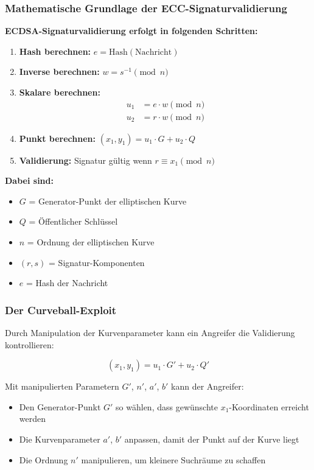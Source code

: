 \documentclass{article}
\begin{document}
\subsubsection{Mathematische Grundlage der ECC-Signaturvalidierung}

\textbf{ECDSA-Signaturvalidierung erfolgt in folgenden Schritten:}

\begin{enumerate}
    \item \textbf{Hash berechnen:} $e = \text{Hash}(\text{Nachricht})$
    \item \textbf{Inverse berechnen:} $w = s^{-1} \pmod{n}$
    \item \textbf{Skalare berechnen:} 
    \begin{align}
    u_1 &= e \cdot w \pmod{n} \\
    u_2 &= r \cdot w \pmod{n}
    \end{align}
    \item \textbf{Punkt berechnen:} $(x_1, y_1) = u_1 \cdot G + u_2 \cdot Q$
    \item \textbf{Validierung:} Signatur gültig wenn $r \equiv x_1 \pmod{n}$
\end{enumerate}

\textbf{Dabei sind:}
\begin{itemize}
    \item $G$ = Generator-Punkt der elliptischen Kurve
    \item $Q$ = Öffentlicher Schlüssel  
    \item $n$ = Ordnung der elliptischen Kurve
    \item $(r,s)$ = Signatur-Komponenten
    \item $e$ = Hash der Nachricht
\end{itemize}

\subsubsection{Der Curveball-Exploit}

Durch Manipulation der Kurvenparameter kann ein Angreifer die Validierung kontrollieren:

\begin{equation}
(x_1, y_1) = u_1 \cdot G' + u_2 \cdot Q'
\end{equation}

Mit manipulierten Parametern $G'$, $n'$, $a'$, $b'$ kann der Angreifer:
\begin{itemize}
    \item Den Generator-Punkt $G'$ so wählen, dass gewünschte $x_1$-Koordinaten erreicht werden
    \item Die Kurvenparameter $a'$, $b'$ anpassen, damit der Punkt auf der Kurve liegt
    \item Die Ordnung $n'$ manipulieren, um kleinere Suchräume zu schaffen
\end{itemize}
\end{document}
